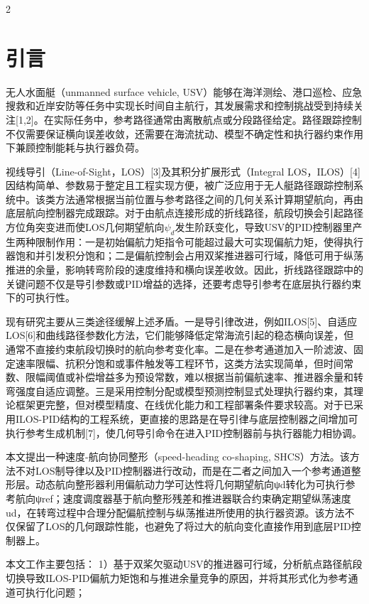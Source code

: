\documentclass[authordraft]{ctacn}%
\begin{document}
\begin{multicols}{2}
\section{引\quad  言}
无人水面艇（unmanned surface vehicle, USV）能够在海洋测绘、港口巡检、应急搜救和近岸安防等任务中实现长时间自主航行，其发展需求和控制挑战受到持续关注[1,2]。在实际任务中，参考路径通常由离散航点或分段路径给定。路径跟踪控制不仅需要保证横向误差收敛，还需要在海流扰动、模型不确定性和执行器约束作用下兼顾控制能耗与执行器负荷。

视线导引（Line-of-Sight，LOS）[3]及其积分扩展形式（Integral LOS，ILOS）[4]因结构简单、参数易于整定且工程实现方便，被广泛应用于无人艇路径跟踪控制系统中。该类方法通常根据当前位置与参考路径之间的几何关系计算期望航向，再由底层航向控制器完成跟踪。对于由航点连接形成的折线路径，航段切换会引起路径方位角突变进而使LOS几何期望航向$\psi_d$发生阶跃变化，导致USV的PID控制器里产生两种限制作用：一是初始偏航力矩指令可能超过最大可实现偏航力矩，使得执行器饱和并引发积分饱和；二是偏航控制会占用双桨推进器可行域，降低可用于纵荡推进的余量，影响转弯阶段的速度维持和横向误差收敛。因此，折线路径跟踪中的关键问题不仅是导引参数或PID增益的选择，还要考虑导引参考在底层执行器约束下的可执行性。

现有研究主要从三类途径缓解上述矛盾。一是导引律改进，例如ILOS[5]、自适应LOS[6]和曲线路径参数化方法，它们能够降低定常海流引起的稳态横向误差，但通常不直接约束航段切换时的航向参考变化率。二是在参考通道加入一阶滤波、固定速率限幅、抗积分饱和或事件触发等工程环节，这类方法实现简单，但时间常数、限幅阈值或补偿增益多为预设常数，难以根据当前偏航速率、推进器余量和转弯强度自适应调整。三是采用控制分配或模型预测控制显式处理执行器约束，其理论框架更完整，但对模型精度、在线优化能力和工程部署条件要求较高。对于已采用ILOS-PID结构的工程系统，更直接的思路是在导引律与底层控制器之间增加可执行参考生成机制[7]，使几何导引命令在进入PID控制器前与执行器能力相协调。

本文提出一种速度-航向协同整形（speed-heading co-shaping, SHCS）方法。该方法不对LOS制导律以及PID控制器进行改动，而是在二者之间加入一个参考通道整形层。动态航向整形器利用偏航动力学可达性将几何期望航向ψd转化为可执行参考航向ψref；速度调度器基于航向整形残差和推进器联合约束确定期望纵荡速度ud，在转弯过程中合理分配偏航控制与纵荡推进所使用的执行器资源。该方法不仅保留了LOS的几何跟踪性能，也避免了将过大的航向变化直接作用到底层PID控制器上。

本文工作主要包括：
1）基于双桨欠驱动USV的推进器可行域，分析航点路径航段切换导致ILOS-PID偏航力矩饱和与推进余量竞争的原因，并将其形式化为参考通道可执行化问题；


\end{multicols}
\end{document}
